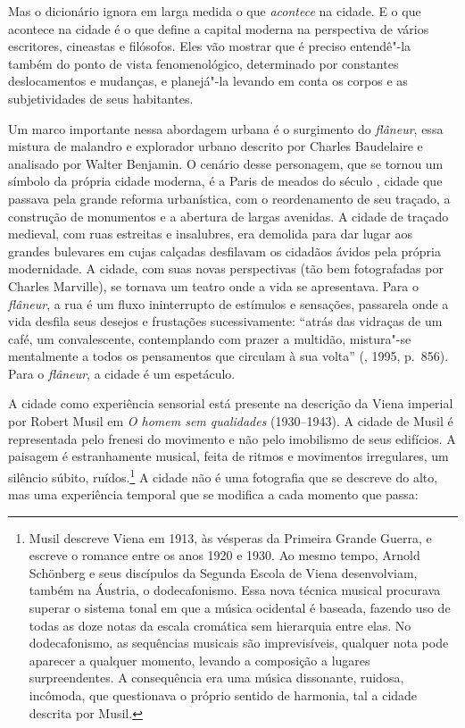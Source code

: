 Mas o dicionário ignora em larga medida o que \emph{acontece} na cidade.
E o que acontece na cidade é o que define a capital moderna na
perspectiva de vários escritores, cineastas e filósofos. Eles vão
mostrar que é preciso entendê"-la também do ponto de vista
fenomenológico, determinado por constantes deslocamentos e mudanças, e
planejá"-la levando em conta os corpos e as subjetividades de seus
habitantes.

Um marco importante nessa abordagem urbana é o surgimento do
\emph{flâneur}, essa mistura de malandro e explorador urbano descrito
por Charles Baudelaire e analisado por Walter Benjamin. O cenário desse
personagem, que se tornou um símbolo da própria cidade moderna, é a
Paris de meados do século , cidade que passava pela grande reforma
urbanística, com o reordenamento de seu traçado, a construção de
monumentos e a abertura de largas avenidas. A cidade de traçado
medieval, com ruas estreitas e insalubres, era demolida para dar lugar
aos grandes bulevares em cujas calçadas desfilavam os cidadãos ávidos
pela própria modernidade. A cidade, com suas novas perspectivas (tão bem
fotografadas por Charles Marville), se tornava um teatro onde a vida se
apresentava. Para o \emph{flâneur}, a rua é um fluxo ininterrupto de
estímulos e sensações, passarela onde a vida desfila seus desejos e
frustações sucessivamente: ``atrás das vidraças de um café, um
convalescente, contemplando com prazer a multidão, mistura"-se
mentalmente a todos os pensamentos que circulam à sua volta''
(, 1995, p.~856). Para o \emph{flâneur}, a cidade é um
espetáculo.

A cidade como experiência sensorial está presente na descrição da Viena
imperial por Robert Musil em \emph{O homem sem qualidades} (1930--1943). A
cidade de Musil é representada pelo frenesi do movimento e não pelo
imobilismo de seus edifícios. A paisagem é estranhamente musical, feita
de ritmos e movimentos irregulares, um silêncio súbito,
ruídos.\footnote{Musil descreve Viena em 1913, às vésperas da Primeira
  Grande Guerra, e escreve o romance entre os anos 1920 e 1930. Ao mesmo
  tempo, Arnold Schönberg e seus discípulos da Segunda Escola de Viena
  desenvolviam, também na Áustria, o dodecafonismo. Essa nova técnica
  musical procurava superar o sistema tonal em que a música ocidental é
  baseada, fazendo uso de todas as doze notas da escala cromática sem
  hierarquia entre elas. No dodecafonismo, as sequências musicais são
  imprevisíveis, qualquer nota pode aparecer a qualquer momento, levando
  a composição a lugares surpreendentes. A consequência era uma música
  dissonante, ruidosa, incômoda, que questionava o próprio sentido de
  harmonia, tal a cidade descrita por Musil.} A cidade não é uma
fotografia que se descreve do alto, mas uma experiência temporal que se
modifica a cada momento que passa:

